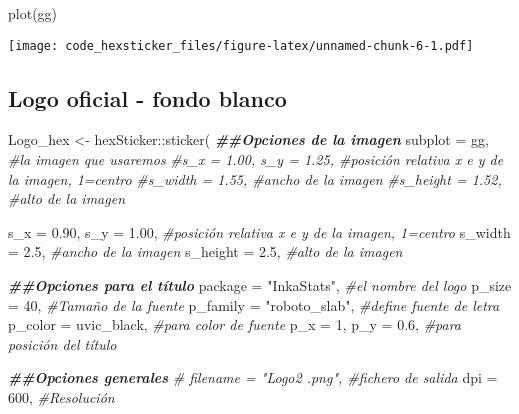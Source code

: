 \documentclass[
]{article}
\newenvironment{Shaded}{\begin{snugshade}}{\end{snugshade}}
\newcommand{\AttributeTok}[1]{\textcolor[rgb]{0.77,0.63,0.00}{#1}}
\newcommand{\CommentTok}[1]{\textcolor[rgb]{0.56,0.35,0.01}{\textit{#1}}}
\newcommand{\DecValTok}[1]{\textcolor[rgb]{0.00,0.00,0.81}{#1}}
\newcommand{\DocumentationTok}[1]{\textcolor[rgb]{0.56,0.35,0.01}{\textbf{\textit{#1}}}}
\newcommand{\FloatTok}[1]{\textcolor[rgb]{0.00,0.00,0.81}{#1}}
\newcommand{\FunctionTok}[1]{\textcolor[rgb]{0.00,0.00,0.00}{#1}}
\newcommand{\NormalTok}[1]{#1}
\newcommand{\OtherTok}[1]{\textcolor[rgb]{0.56,0.35,0.01}{#1}}
\newcommand{\SpecialCharTok}[1]{\textcolor[rgb]{0.00,0.00,0.00}{#1}}
\newcommand{\StringTok}[1]{\textcolor[rgb]{0.31,0.60,0.02}{#1}}
\begin{document}
\begin{Shaded}
\begin{Highlighting}[]
\FunctionTok{plot}\NormalTok{(gg)}
\end{Highlighting}
\end{Shaded}

\texttt{[image: code\_hexsticker\_files/figure-latex/unnamed-chunk-6-1.pdf]}

\hypertarget{logo-oficial---fondo-blanco}{%
\subsection{Logo oficial - fondo
blanco}\label{logo-oficial---fondo-blanco}}

\begin{Shaded}
\begin{Highlighting}[]
\NormalTok{Logo\_hex }\OtherTok{\textless{}{-}}\NormalTok{ hexSticker}\SpecialCharTok{::}\FunctionTok{sticker}\NormalTok{(}
    \DocumentationTok{\#\#Opciones de la imagen}
    \AttributeTok{subplot              =}\NormalTok{ gg, }\CommentTok{\#la imagen que usaremos}
    \CommentTok{\#s\_x                  = 1.00, s\_y = 1.25, \#posición relativa x e y de la imagen, 1=centro}
    \CommentTok{\#s\_width              = 1.55, \#ancho de la imagen}
    \CommentTok{\#s\_height             = 1.52, \#alto de la imagen}
    
    \AttributeTok{s\_x                  =} \FloatTok{0.90}\NormalTok{, }
    \AttributeTok{s\_y                  =} \FloatTok{1.00}\NormalTok{, }\CommentTok{\#posición relativa x e y de la imagen, 1=centro}
    \AttributeTok{s\_width              =} \FloatTok{2.5}\NormalTok{, }\CommentTok{\#ancho de la imagen}
    \AttributeTok{s\_height             =} \FloatTok{2.5}\NormalTok{, }\CommentTok{\#alto de la imagen}

    \DocumentationTok{\#\#Opciones para el título}
    \AttributeTok{package              =} \StringTok{"InkaStats"}\NormalTok{, }\CommentTok{\#el nombre del logo}
    \AttributeTok{p\_size               =} \DecValTok{40}\NormalTok{, }\CommentTok{\#Tamaño de la fuente}
    \AttributeTok{p\_family             =} \StringTok{"roboto\_slab"}\NormalTok{, }\CommentTok{\#define fuente de letra}
    \AttributeTok{p\_color              =}\NormalTok{ uvic\_black, }\CommentTok{\#para color de fuente}
    \AttributeTok{p\_x                  =} \DecValTok{1}\NormalTok{, }\AttributeTok{p\_y =} \FloatTok{0.6}\NormalTok{, }\CommentTok{\#para posición del título}
    
    \DocumentationTok{\#\#Opciones generales}
    \CommentTok{\# filename           = "Logo2 .png", \#fichero de salida}
    \AttributeTok{dpi                  =} \DecValTok{600}\NormalTok{, }\CommentTok{\#Resolución}
    

\end{Highlighting}
\end{Shaded}
\end{document}
